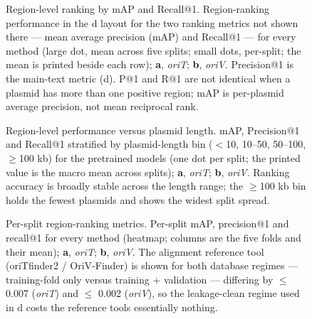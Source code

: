 \begin{figure}[h]
    \centering
\caption{
Region-level ranking by mAP and Recall@1. Region-ranking performance in the d layout for the two ranking metrics not shown there --- mean average precision (mAP) and Recall@1 --- for every method (large dot, mean across five splits; small dots, per-split; the mean is printed beside each row); \textbf{a}, \emph{oriT}; \textbf{b}, \emph{oriV}. Precision@1 is the main-text metric (d). P@1 and R@1 are not identical when a plasmid has more than one positive region; mAP is per-plasmid average precision, not mean reciprocal rank.
}
\label{fig:supp-regforest}
\end{figure}

\begin{figure}[h]
    \centering
\caption{
Region-level performance versus plasmid length. mAP, Precision@1 and Recall@1 stratified by plasmid-length bin ($<$10, 10--50, 50--100, $\geq$100 kb) for the pretrained models (one dot per split; the printed value is the macro mean across splits); \textbf{a}, \emph{oriT}; \textbf{b}, \emph{oriV}. Ranking accuracy is broadly stable across the length range; the $\geq$100 kb bin holds the fewest plasmids and shows the widest split spread.
}
\label{fig:supp-maplen}
\end{figure}

\begin{figure}[h]
    \centering
\caption{
Per-split region-ranking metrics. Per-split mAP, precision@1 and recall@1 for every method (heatmap; columns are the five folds and their mean); \textbf{a}, \emph{oriT}; \textbf{b}, \emph{oriV}. The alignment reference tool (oriTfinder2 / OriV-Finder) is shown for both database regimes --- training-fold only versus training + validation --- differing by $\leq$ 0.007 (\emph{oriT}) and $\leq$ 0.002 (\emph{oriV}), so the leakage-clean regime used in d costs the reference tools essentially nothing.
}
\label{fig:supp-reftool}
\end{figure}


\clearpage

